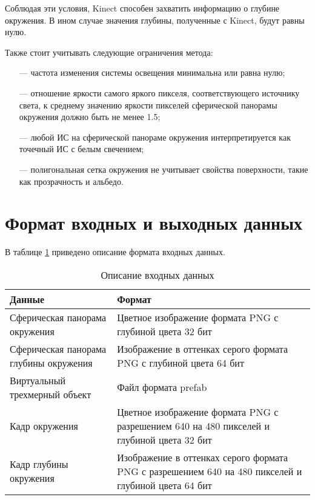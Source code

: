 Соблюдая эти условия, Kinect способен захватить информацию о глубине окружения. В ином случае значения глубины, полученные с Kinect, будут равны нулю.

Также стоит учитывать следующие ограничения метода:

\begin{itemize}
	\item[---] частота изменения системы освещения минимальна или равна нулю;
	\item[---] отношение яркости самого яркого пикселя, соответствующего источнику света, к среднему значению яркости пикселей сферической панорамы окружения должно быть не менее 1.5;
	\item[---] любой ИС на сферической панораме окружения интерпретируется как точечный ИС с белым свечением;
	\item[---] полигональная сетка окружения не учитывает свойства поверхности, такие как прозрачность и альбедо.
\end{itemize}

\section{Формат входных и выходных данных}

В таблице \ref{FormatData} приведено описание формата входных данных.

\begin{table}[H]
	\caption{Описание входных данных}
	\label{FormatData}
	\begin{center}
		\begin{tabular}{| p{6 cm} | p{9 cm} |} 
			\hline
			Данные & Формат \\
			\hline
			Сферическая панорама окружения & Цветное изображение формата PNG с глубиной цвета 32 бит \\
			\hline
			Сферическая панорама глубины окружения & Изображение в оттенках серого формата PNG с глубиной цвета 64 бит \\
			\hline
			Виртуальный трехмерный объект & Файл формата prefab \\
			\hline
			Кадр окружения & Цветное изображение формата PNG с разрешением 640 на 480 пикселей и глубиной цвета 32 бит \\
			\hline
			Кадр глубины окружения & Изображение в оттенках серого формата PNG с разрешением 640 на 480 пикселей и глубиной цвета 64 бит \\
			\hline
		\end{tabular}
	\end{center}
\end{table}

